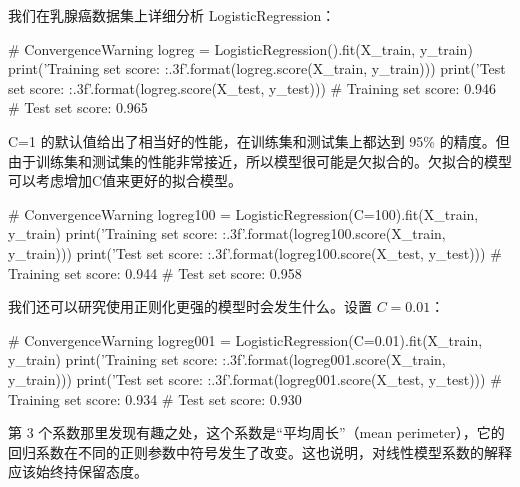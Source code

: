 我们在乳腺癌数据集上详细分析 LogisticRegression：
\begin{pyc}
    # ConvergenceWarning
    logreg = LogisticRegression().fit(X_train, y_train)
    print('Training set score: {:.3f}'.format(logreg.score(X_train, y_train)))
    print('Test set score: {:.3f}'.format(logreg.score(X_test, y_test)))
    # Training set score: 0.946
    # Test set score: 0.965
\end{pyc}

C=1 的默认值给出了相当好的性能，在训练集和测试集上都达到 95\% 的精度。但由于训练集和测试集的性能非常接近，所以模型很可能是欠拟合的。欠拟合的模型可以考虑增加C值来更好的拟合模型。

\begin{pyc}
    # ConvergenceWarning
    logreg100 = LogisticRegression(C=100).fit(X_train, y_train)
    print('Training set score: {:.3f}'.format(logreg100.score(X_train, y_train)))
    print('Test set score: {:.3f}'.format(logreg100.score(X_test, y_test)))
    # Training set score: 0.944
    # Test set score: 0.958
\end{pyc}

我们还可以研究使用正则化更强的模型时会发生什么。设置 $C=0.01$：

\begin{pyc}
    # ConvergenceWarning
    logreg001 = LogisticRegression(C=0.01).fit(X_train, y_train)
    print('Training set score: {:.3f}'.format(logreg001.score(X_train, y_train)))
    print('Test set score: {:.3f}'.format(logreg001.score(X_test, y_test)))
    # Training set score: 0.934
    # Test set score: 0.930
\end{pyc}


\begin{tcolorbox}
    第 3 个系数那里发现有趣之处，这个系数是“平均周长”（mean perimeter），它的回归系数在不同的正则参数中符号发生了改变。这也说明，对线性模型系数的解释应该始终持保留态度。
\end{tcolorbox}